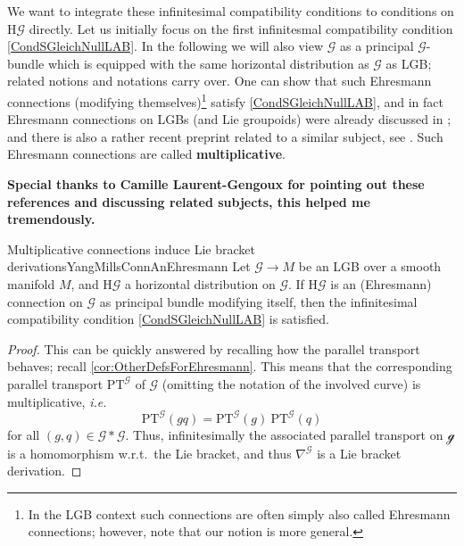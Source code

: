 \documentclass[reqno,a4paper,oneside]{amsart}
\theoremstyle{plain}
\theoremstyle{remark}
\theoremstyle{definition}
\begin{document}
We want to integrate these infinitesimal compatibility conditions to conditions on $\mathrm{H}\mathcal{G}$ directly.
Let us initially focus on the first infinitesmal compatibility condition \eqref{CondSGleichNullLAB}. In the following we will also view $\mathcal{G}$ as a principal $\mathcal{G}$-bundle which is equipped with the same horizontal distribution as $\mathcal{G}$ as LGB; related notions and notations carry over. One can show that such Ehresmann connections (modifying themselves)\footnote{In the LGB context such connections are often simply also called Ehresmann connections; however, note that our notion is more general.} satisfy \eqref{CondSGleichNullLAB}, and in fact Ehresmann connections on LGBs (and Lie groupoids) were already discussed in \cite{LAURENTGENGOUXStienonXuMultiplicativeForms}; and there is also a rather recent preprint related to a similar subject, see \cite{FernandesMarcutMultiplicativeForms}. Such Ehresmann connections are called \textbf{multiplicative}.

\textbf{Special thanks to Camille Laurent-Gengoux for pointing out these references and discussing related subjects, this helped me tremendously.}

\begin{lemmata}{Multiplicative connections induce Lie bracket derivations}{YangMillsConnAnEhresmann}
Let $\mathcal{G} \to M$ be an LGB over a smooth manifold $M$, and $\mathrm{H}\mathcal{G}$ a horizontal distribution on $\mathcal{G}$. If $\mathrm{H}\mathcal{G}$ is an (Ehresmann) connection on $\mathcal{G}$ as principal bundle modifying itself, then the infinitesimal compatibility condition \eqref{CondSGleichNullLAB} is satisfied.
\end{lemmata}

\begin{proof}
\leavevmode\newline
This can be quickly answered by recalling how the parallel transport behaves; recall \ref{cor:OtherDefsForEhresmann}. This means that the corresponding parallel transport $\mathrm{PT}^{\mathcal{G}}$ of $\mathcal{G}$ (omitting the notation of the involved curve) is multiplicative, \textit{i.e.}\
\begin{equation*}
\mathrm{PT}^{\mathcal{G}}(gq)
=
\mathrm{PT}^{\mathcal{G}}(g) ~ \mathrm{PT}^{\mathcal{G}}(q)
\end{equation*}
for all $(g, q) \in \mathcal{G} * \mathcal{G}$. Thus, infinitesimally the associated parallel transport on $\mathcal{g}$ is a homomorphism w.r.t.\ the Lie bracket, and thus $\nabla^{\mathcal{G}}$ is a Lie bracket derivation.
\end{proof}
\end{document}
